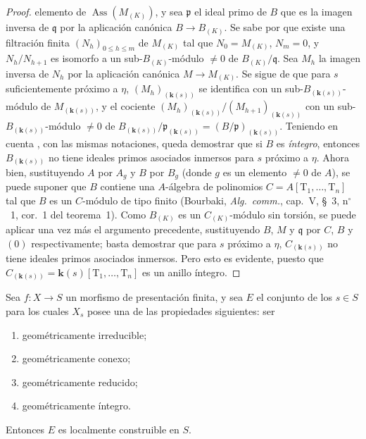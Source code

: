\begin{proof}
elemento de $\operatorname{Ass}(M_{(K)})$, y sea $\mathfrak p$ el ideal primo de $B$ que es la imagen inversa de $\mathfrak q$ por la aplicación canónica $B\to B_{(K)}$.
Se sabe por  que existe una filtración finita $(N_h)_{0\leqslant h\leqslant m}$ de $M_{(K)}$ tal que $N_0=M_{(K)}$, $N_m=0$, y $N_h/N_{h+1}$ es isomorfo a un sub-$B_{(K)}$-módulo $\neq0$ de $B_{(K)}/\mathfrak q$.
Sea $M_h$ la imagen inversa de $N_h$ por la aplicación canónica $M\to M_{(K)}$.
Se sigue de  que para $s$ suficientemente próximo a $\eta$, $(M_h)_{(\mathbf{k}(s))}$ se identifica con un sub-$B_{(\mathbf{k}(s))}$-módulo de $M_{(\mathbf{k}(s))}$, y el cociente $(M_h)_{(\mathbf{k}(s))}/(M_{h+1})_{(\mathbf{k}(s))}$ con un sub-$B_{(\mathbf{k}(s))}$-módulo $\neq0$ de $B_{(\mathbf{k}(s))}/\mathfrak p_{(\mathbf{k}(s))}
=(B/\mathfrak p)_{(\mathbf{k}(s))}$.
Teniendo en cuenta , con las mismas notaciones, queda demostrar que si $B$ es \emph{íntegro}, entonces $B_{(\mathbf{k}(s))}$ no tiene ideales primos asociados inmersos para $s$ próximo a $\eta$.
Ahora bien, sustituyendo $A$ por $A_g$ y $B$ por $B_g$ (donde $g$ es un elemento $\neq0$ de $A$), se puede suponer que $B$ contiene una $A$-álgebra de polinomios $C=A[\mathrm T_1,\ldots,\mathrm T_n]$ tal que $B$ es un $C$-módulo de tipo finito (Bourbaki, \emph{Alg.\ comm.}, cap.\ V, \S~3, n$^\circ$~1, cor.\ 1 del teorema\ 1).
Como $B_{(K)}$ es un $C_{(K)}$-módulo sin torsión, se puede aplicar una vez más el argumento precedente, sustituyendo $B$, $M$ y $\mathfrak q$ por $C$, $B$ y $(0)$ respectivamente; basta demostrar que para $s$ próximo a $\eta$, $C_{(\mathbf{k}(s))}$ no tiene ideales primos asociados inmersos.
Pero esto es evidente, puesto que $C_{(\mathbf{k}(s))}=\boldsymbol{k}(s)[\mathrm T_1,\ldots,\mathrm T_n]$ es un anillo íntegro.
\end{proof}

\begin{theorem}[9.7.7]
\label{IV.9.7.7}
Sea $f:X\to S$ un morfismo de presentación finita, y sea $E$ el conjunto de los $s\in S$ para los cuales $X_s$ posee una de las propiedades siguientes: ser
\begin{enumerate}[label=\textup{(\roman*)}]
  \item geométricamente irreducible;
  \item geométricamente conexo;
  \item geométricamente reducido;
  \item geométricamente íntegro.
\end{enumerate}
Entonces $E$ es localmente construible en $S$.
\end{theorem}

